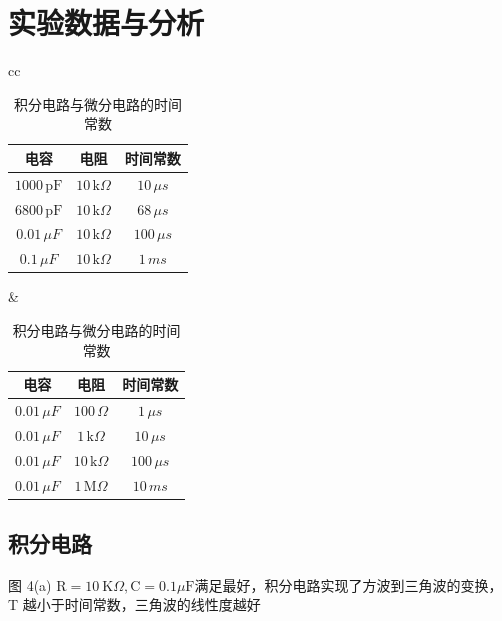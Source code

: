 \documentclass{article}
\begin{document}
\section{实验数据与分析}
\begin{table}[h]
    \centering
    \begin{tabular}{cc}
        \begin{tabular}{|c|c|c|}
            \hline
            \textbf{电容} & \textbf{电阻} & \textbf{时间常数} \\
            \hline
            $1000\,\mathrm{pF}$ & $10\,\mathrm{k}\Omega$ & $10\,\mu s$ \\
            \hline
            $6800\,\mathrm{pF}$ & $10\,\mathrm{k}\Omega$ & $68\,\mu s$ \\
            \hline
            $0.01\,\mu F$ & $10\,\mathrm{k}\Omega$ & $100\,\mu s$ \\
            \hline
            $0.1\,\mu F$ & $10\,\mathrm{k}\Omega$ & $1\,ms$ \\
            \hline
        \end{tabular}
        &
        \begin{tabular}{|c|c|c|}
            \hline
            \textbf{电容} & \textbf{电阻} & \textbf{时间常数} \\
            \hline
            $0.01\,\mu F$ & $100\,\Omega$ & $1\,\mu s$ \\
            \hline
            $0.01\,\mu F$ & $1\,\mathrm{k}\Omega$ & $10\,\mu s$ \\
            \hline
            $0.01\,\mu F$ & $10\,\mathrm{k}\Omega$ & $100\,\mu s$ \\
            \hline
            $0.01\,\mu F$ & $1\,\mathrm{M}\Omega$ & $10\,ms$ \\
            \hline
        \end{tabular}
    \end{tabular}
    \caption{积分电路与微分电路的时间常数}
    \label{tab:rc_compare}
\end{table}
\subsection{积分电路}
 图 4(a)  $\mathrm{R}=10 \mathrm{~K} \Omega, \mathrm{C}=0.1 \mu \mathrm{F}$满足最好，积分电路实现了方波到三角波的变换，T 越小于时间常数，三角波的线性度越好
\end{document}
